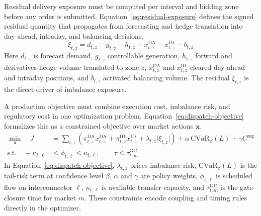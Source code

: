 \documentclass[oneside,10pt]{swissi}
\begin{document}
Residual delivery exposure must be computed per interval and bidding zone before any order is submitted. Equation~\eqref{eq:residual-exposure} defines the signed residual quantity that propagates from forecasting and hedge translation into day-ahead, intraday, and balancing decisions.
\begin{equation}
\xi_{t,z} = d_{t,z} - g_{t,z} - h_{t,z} - x^{\mathrm{DA}}_{t,z} - x^{\mathrm{ID}}_{t,z} - b_{t,z}
\label{eq:residual-exposure}
\end{equation}
Here $d_{t,z}$ is forecast demand, $g_{t,z}$ controllable generation, $h_{t,z}$ forward and derivatives hedge volume translated to zone $z$, $x^{\mathrm{DA}}_{t,z}$ and $x^{\mathrm{ID}}_{t,z}$ cleared day-ahead and intraday positions, and $b_{t,z}$ activated balancing volume. The residual $\xi_{t,z}$ is the direct driver of imbalance exposure.\cite{eu_reg_2016_1719,nord_pool_day_ahead_2026,nord_pool_intraday_2026,eu_reg_2019_943}

A production objective must combine execution cost, imbalance risk, and regulatory cost in one optimization problem. Equation~\eqref{eq:dispatch-objective} formalizes this as a constrained objective over market actions $\mathbf{x}$.
\begin{align}
\min_{\mathbf{x}} \quad
J &= \sum_{t,z}\left(\pi^{\mathrm{DA}}_{t,z}x^{\mathrm{DA}}_{t,z} + \pi^{\mathrm{ID}}_{t,z}x^{\mathrm{ID}}_{t,z} + \lambda_{t,z}\lvert \xi_{t,z}\rvert\right)
+ \alpha\,\mathrm{CVaR}_{\beta}(L) + \gamma C^{\mathrm{reg}}
\label{eq:dispatch-objective} \\
\text{s.t.}\quad
-\kappa_{t,\ell} &\le \phi_{t,\ell} \le \kappa_{t,\ell},\qquad
\tau \le \tau^{\mathrm{GC}}_{t,m} \nonumber
\end{align}
In Equation~\eqref{eq:dispatch-objective}, $\lambda_{t,z}$ prices imbalance risk, $\mathrm{CVaR}_{\beta}(L)$ is the tail-risk term at confidence level $\beta$, $\alpha$ and $\gamma$ are policy weights, $\phi_{t,\ell}$ is scheduled flow on interconnector $\ell$, $\kappa_{t,\ell}$ is available transfer capacity, and $\tau^{\mathrm{GC}}_{t,m}$ is the gate-closure time for market $m$. These constraints encode coupling and timing rules directly in the optimizer.\cite{acer_market_coupling_development_2026,nord_pool_day_ahead_2026,ec_network_codes_2026}
\end{document}
